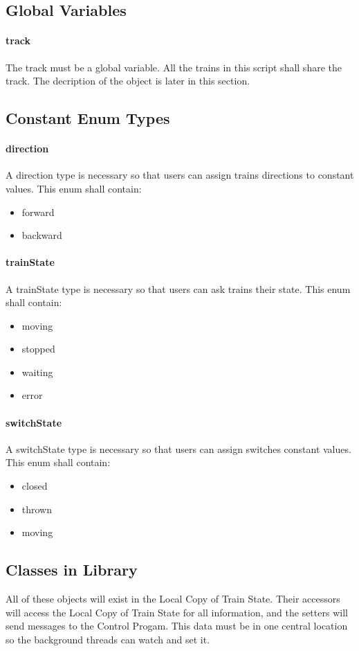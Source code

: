 \documentclass[a4paper,11pt,notitlepage]{article}
\def\CS{Control Progam\xspace}
\def\LC{Local Copy of Train State\xspace}
\begin{document}
\subsection{Global Variables}
\paragraph{track} The track must be a global variable. All the trains in this script shall share the track. The decription of the object is later in this section.
\subsection{Constant Enum Types}
\paragraph{direction} A direction type is necessary so that users can assign trains directions to constant values. This enum shall contain:
\begin{itemize}
\item forward
\item backward
\end{itemize}
\paragraph{trainState} A trainState type is necessary so that users can ask trains their state. This enum shall contain:
\begin{itemize}
\item moving
\item stopped
\item waiting
\item error
\end{itemize}
\paragraph{switchState} A switchState type is necessary so that users can assign switches constant values. This enum shall contain:
\begin{itemize}
\item closed
\item thrown
\item moving
\end{itemize}
\subsection{Classes in Library}
All of these objects will exist in the \LC. Their accessors will access the \LC for all information, and the setters will send messages to the \CS. This data must be in one central location so the background threads can watch and set it.
\end{document}
